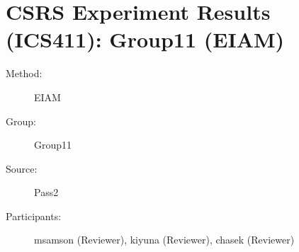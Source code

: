 \chapter {CSRS Experiment Results (ICS411): Group11 (EIAM)}
\small

\begin{description}
\item [Method:] EIAM
\item [Group:] Group11
\item [Source:] Pass2
\item [Participants:] msamson (Reviewer), kiyuna (Reviewer), chasek (Reviewer)
\end{description}
